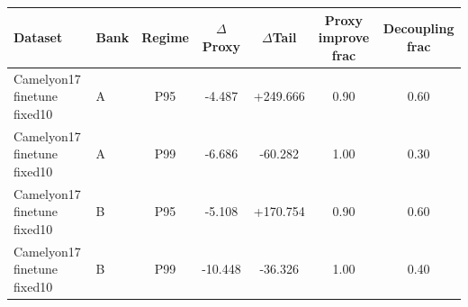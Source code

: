 \begin{tabular}{llccccc}
  \toprule
  Dataset & Bank & Regime & $\Delta$Proxy & $\Delta$Tail & Proxy improve frac & Decoupling frac \\
  \midrule
  Camelyon17 finetune fixed10 & A & P95 & -4.487 & +249.666 & 0.90 & 0.60 \\
  Camelyon17 finetune fixed10 & A & P99 & -6.686 & -60.282 & 1.00 & 0.30 \\
  Camelyon17 finetune fixed10 & B & P95 & -5.108 & +170.754 & 0.90 & 0.60 \\
  Camelyon17 finetune fixed10 & B & P99 & -10.448 & -36.326 & 1.00 & 0.40 \\
  \bottomrule
\end{tabular}
